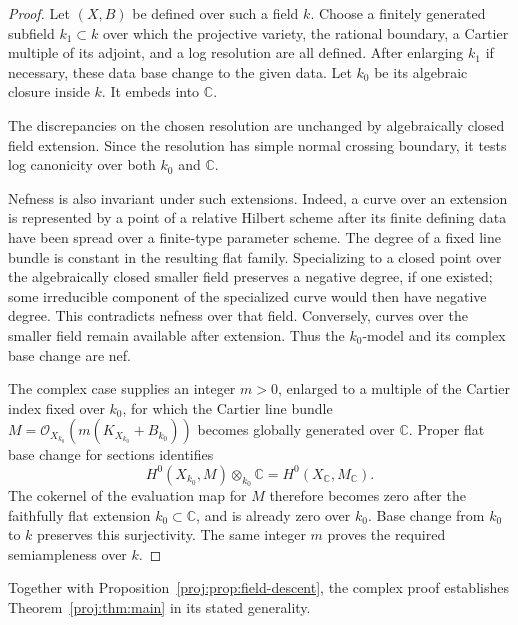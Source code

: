 \documentclass[11pt,letterpaper]{article}
\newcommand{\C}{\mathbb{C}}
\newcommand{\OO}{\mathcal{O}}
\theoremstyle{definition}
\theoremstyle{remark}
\begin{document}
\begin{proof}
Let \((X,B)\) be defined over such a field \(k\). Choose a finitely
generated subfield \(k_1\subset k\) over which the projective variety,
the rational boundary, a Cartier multiple of its adjoint, and a log
resolution are all defined. After enlarging \(k_1\) if necessary,
these data base change to the given data. Let \(k_0\) be its algebraic
closure inside \(k\). It embeds into \(\C\).

The discrepancies on the chosen resolution are unchanged by
algebraically closed field extension. Since the resolution has simple
normal crossing boundary, it tests log canonicity over both \(k_0\)
and \(\C\).

Nefness is also invariant under such extensions. Indeed, a curve
over an extension is represented by a point of a relative Hilbert
scheme after its finite defining data have been spread over a
finite-type parameter scheme. The degree of a fixed line bundle is
constant in the resulting flat family. Specializing to a closed
point over the algebraically closed smaller field preserves a
negative degree, if one existed; some irreducible component of the
specialized curve would then have negative degree. This contradicts
nefness over that field. Conversely, curves over the smaller field
remain available after extension. Thus the \(k_0\)-model and its
complex base change are nef.

The complex case supplies an integer \(m>0\), enlarged to a multiple
of the Cartier index fixed over \(k_0\), for which the Cartier
line bundle \(M=\OO_{X_{k_0}}(m(K_{X_{k_0}}+B_{k_0}))\) becomes
globally generated over \(\C\). Proper flat base change for sections
identifies
\[
 H^0(X_{k_0},M)\otimes_{k_0}\C
   = H^0(X_{\C},M_{\C}).
\]
The cokernel of the evaluation map for \(M\) therefore becomes zero
after the faithfully flat extension \(k_0\subset\C\), and is already
zero over \(k_0\). Base change from \(k_0\) to \(k\) preserves this
surjectivity. The same integer \(m\) proves the required
semiampleness over \(k\).
\end{proof}

Together with Proposition~\ref{proj:prop:field-descent}, the complex proof
establishes Theorem~\ref{proj:thm:main} in its stated generality.

\clearpage
{}
{}


\end{document}
